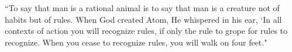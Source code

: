 ``To say that man is a rational animal is to say that man is a creature not of
habits but of rules. When God created Atom, He whispered in his ear, `In all
contexts of action you will recognize rules, if only the rule to grope for rules
to recognize. When you cease to recognize rules, you will walk on four feet."
